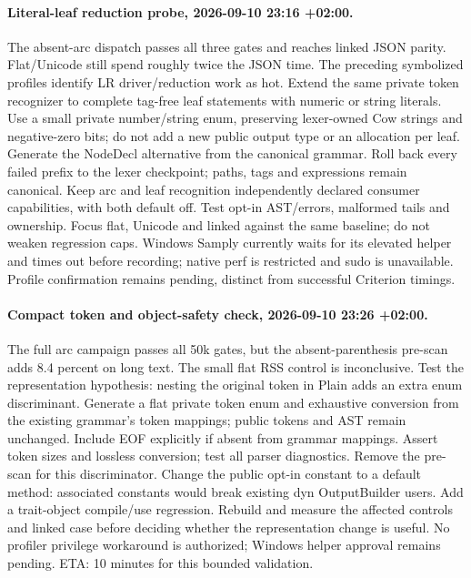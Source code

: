 \documentclass[11pt,a4paper]{article}
\begin{document}
\paragraph{Literal-leaf reduction probe, 2026-09-10 23:16 +02:00.}
The absent-arc dispatch passes all three gates and reaches linked JSON parity.
Flat/Unicode still spend roughly twice the JSON time. The preceding symbolized
profiles identify LR driver/reduction work as hot. Extend the same private token
recognizer to complete tag-free leaf statements with numeric or string literals.
Use a small private number/string enum, preserving lexer-owned Cow strings and
negative-zero bits; do not add a new public output type or an allocation per leaf.
Generate the NodeDecl alternative from the canonical grammar. Roll back every
failed prefix to the lexer checkpoint; paths, tags and expressions remain canonical.
Keep arc and leaf recognition independently declared consumer capabilities, with
both default off. Test opt-in AST/errors, malformed tails and ownership. Focus
flat, Unicode and linked against the same baseline; do not weaken regression caps.
Windows Samply currently waits for its elevated helper and times out before
recording; native perf is restricted and sudo is unavailable. Profile confirmation
remains pending, distinct from successful Criterion timings.

\paragraph{Compact token and object-safety check, 2026-09-10 23:26 +02:00.}
The full arc campaign passes all 50k gates, but the absent-parenthesis pre-scan
adds 8.4 percent on long text. The small flat RSS control is inconclusive.
Test the representation hypothesis: nesting the original token in Plain adds an
extra enum discriminant. Generate a flat private token enum and exhaustive conversion
from the existing grammar's token mappings; public tokens and AST remain unchanged.
Include EOF explicitly if absent from grammar mappings. Assert token sizes and lossless
conversion; test all parser diagnostics. Remove the pre-scan for this discriminator.
Change the public opt-in constant to a default method: associated constants would
break existing dyn OutputBuilder users. Add a trait-object compile/use regression.
Rebuild and measure the affected controls and linked case before deciding whether
the representation change is useful. No profiler privilege workaround is authorized;
Windows helper approval remains pending. ETA: 10 minutes for this bounded validation.
\end{document}
